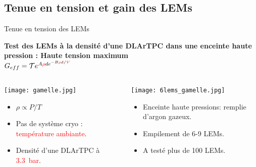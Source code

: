     \subsection[Tension et gain]{Tenue en tension et gain des LEMs}

    \begin{frame}{Tenue en tension des LEMs}
    	\begin{scriptsize}
    		\begin{center}
    			\textbf{Test des LEMs à la densité d'une DLArTPC dans une enceinte haute pression : Haute tension maximum}\\
    			$G _{eff}= \mathcal{T}e^{A\textcolor{red}{\rho} d e^{-B\textcolor{red}{\rho}d/\textcolor{red}{V}}}$
    		\end{center} 
    		\begin{columns}
		    	\begin{column}{0.5\textwidth}
		    		\texttt{[image: gamelle.jpg]}\\
		    		\begin{itemize}
		    			\item $\rho \propto P/T$
		    			\item Pas de système cryo : \textcolor{red}{température ambiante}.
		    			\item Densité d'une DLArTPC à \textcolor{red}{\SI{3.3}{\bar}}.
		    		\end{itemize}
		    	\end{column}\hfill
		    	\begin{column}{0.5\textwidth}
		    		\texttt{[image: 6lems\_gamelle.jpg]}\\
		    		\begin{itemize}
		    			\item Enceinte haute pressions: remplie d'argon gazeux.
		    			\item Empilement de 6-9 LEMs.
		    			\item A testé plus de 100 LEMs.
		    		\end{itemize}
		    	\end{column}
		    \end{columns}
	    \end{scriptsize} 
    \end{frame}

